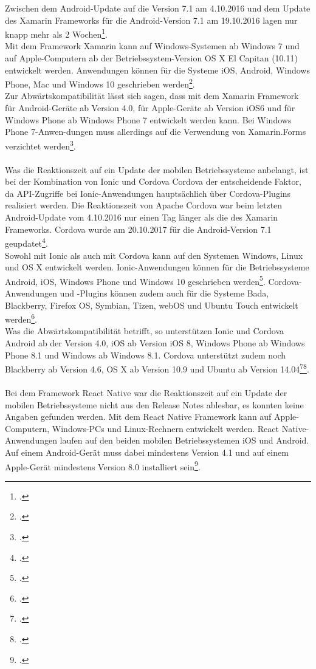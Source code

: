 Zwischen dem Android-Update auf die Version 7.1 am 4.10.2016 und dem Update des Xamarin Frameworks für die Android-Version 7.1 am 19.10.2016 lagen nur knapp mehr als 2 Wochen\footcite{XamarinHomepage}.
\\
Mit dem Framework Xamarin kann auf Windows-Systemen ab Windows 7 und auf Apple-Computern ab der Betriebssystem-Version OS X El Capitan (10.11) entwickelt werden. Anwendungen können für die Systeme iOS, Android, Windows Phone, Mac und Windows 10 geschrieben werden\footcite{XamarinHomepage}. 
\\
Zur Abwärtskompatibilität lässt sich sagen, dass mit dem Xamarin Framework für Android-Geräte ab Version 4.0, für Apple-Geräte ab Version iOS6 und für Windows Phone ab Windows Phone 7 entwickelt werden kann. Bei Windows Phone 7-Anwen-dungen muss allerdings auf die Verwendung von Xamarin.Forms verzichtet werden\footcite{XamarinHomepage}.
\\
\\
Was die Reaktionszeit auf ein Update der mobilen Betriebssysteme anbelangt, ist bei der Kombination von Ionic und Cordova Cordova der entscheidende Faktor, da API-Zugriffe bei Ionic-Anwendungen hauptsächlich über Cordova-Plugins realisiert werden. Die Reaktionszeit von Apache Cordova war beim letzten Android-Update vom 4.10.2016 nur einen Tag länger als die des Xamarin Frameworks. Cordova wurde am 20.10.2017 für die Android-Version 7.1 geupdatet\footcite{Cordova}.
\\
Sowohl mit Ionic als auch mit Cordova kann auf den Systemen Windows, Linux und OS X entwickelt werden. Ionic-Anwendungen können für die Betriebssysteme Android, iOS, Windows Phone und Windows 10 geschrieben werden\footcite{IonicHomepage}. Cordova-Anwendungen und -Plugins können zudem auch für die Systeme Bada, Blackberry, Firefox OS, Symbian, Tizen, webOS und Ubuntu Touch entwickelt werden\footcite{Cordova}. 
\\
Was die Abwärtskompatibilität betrifft, so unterstützen Ionic und Cordova Android ab der Version 4.0, iOS ab Version iOS 8, Windows Phone ab Windows Phone 8.1 und Windows ab Windows 8.1. Cordova unterstützt zudem noch Blackberry ab Version 4.6, OS X ab Version 10.9 und Ubuntu ab Version 14.04\footcite{Cordova}\footcite{IonicHomepage}. 
\\
\\
Bei dem Framework React Native war die Reaktionszeit auf ein Update der mobilen Betriebssysteme nicht aus den Release Notes ablesbar, es konnten keine Angaben gefunden werden. Mit dem React Native Framework kann auf Apple-Computern, Windows-PCs und Linux-Rechnern entwickelt werden. React Native-Anwendungen laufen auf den beiden mobilen Betriebssystemen iOS und Android. Auf einem Android-Gerät muss dabei mindestens Version 4.1 und auf einem Apple-Gerät mindestens Version 8.0 installiert sein\footcite{ReactNativeHomepage}. 

